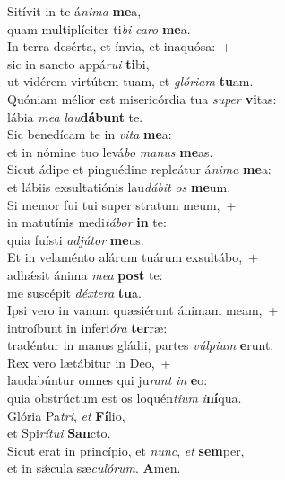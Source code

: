 \evenverse Sitívit in te á\textit{ni}\textit{ma} \textbf{me}a,~\*\\
\evenverse quam multiplíciter ti\textit{bi} \textit{ca}\textit{ro} \textbf{me}a.\\
\oddverse In terra desérta, et ínvia, et inaquósa:~+\\
\oddverse  sic in sancto appá\textit{ru}\textit{i} \textbf{ti}bi,~\*\\
\oddverse ut vidérem virtútem tuam, et \textit{gló}\textit{ri}\textit{am} \textbf{tu}am.\\
\evenverse Quóniam mélior est misericórdia tua \textit{su}\textit{per} \textbf{vi}tas:~\*\\
\evenverse lábia \textit{me}\textit{a} \textit{lau}\textbf{dá}\textbf{bunt} te.\\
\oddverse Sic benedícam te in \textit{vi}\textit{ta} \textbf{me}a:~\*\\
\oddverse et in nómine tuo levá\textit{bo} \textit{ma}\textit{nus} \textbf{me}as.\\
\evenverse Sicut ádipe et pinguédine repleátur á\textit{ni}\textit{ma} \textbf{me}a:~\*\\
\evenverse et lábiis exsultatiónis lau\textit{dá}\textit{bit} \textit{os} \textbf{me}um.\\
\oddverse Si memor fui tui super stratum meum,~+\\
\oddverse  in matutínis medi\textit{tá}\textit{bor} \textbf{in} te:~\*\\
\oddverse quia fuísti \textit{ad}\textit{jú}\textit{tor} \textbf{me}us.\\
\evenverse Et in velaménto alárum tuárum exsultábo,~+\\
\evenverse  adhǽsit ánima \textit{me}\textit{a} \textbf{post} te:~\*\\
\evenverse me suscépit \textit{déx}\textit{te}\textit{ra} \textbf{tu}a.\\
\oddverse Ipsi vero in vanum quæsiérunt ánimam meam,~+\\
\oddverse  introíbunt in inferi\textit{ó}\textit{ra} \textbf{ter}ræ:~\*\\
\oddverse tradéntur in manus gládii, partes \textit{vúl}\textit{pi}\textit{um} \textbf{e}runt.\\
\evenverse Rex vero lætábitur in Deo,~+\\
\evenverse  laudabúntur omnes qui ju\textit{rant} \textit{in} \textbf{e}o:~\*\\
\evenverse quia obstrúctum est os loquén\textit{ti}\textit{um} \textit{i}\textbf{ní}qua.\\
\oddverse Glória Pa\textit{tri}, \textit{et} \textbf{Fí}lio,~\*\\
\oddverse et Spi\textit{rí}\textit{tu}\textit{i} \textbf{San}cto.\\
\evenverse Sicut erat in princípio, et \textit{nunc}, \textit{et} \textbf{sem}per,~\*\\
\evenverse et in sǽcula sæ\textit{cu}\textit{ló}\textit{rum}. \textbf{A}men.\\
